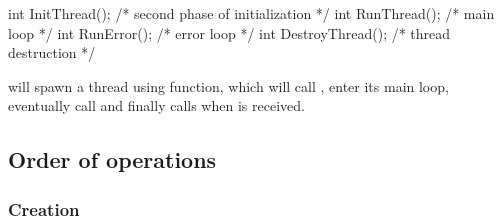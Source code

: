 \begin{csource}
int InitThread();       /* second phase of initialization */
int RunThread();        /* main loop */
int RunError();         /* error loop */
int DestroyThread();    /* thread destruction */
\end{csource}

 will spawn a thread using  
function, which will call , enter its main loop, 
eventually call  and finally calls 
when  is received.

%
%
\subsection{Order of operations}

\subsubsection{Creation}


